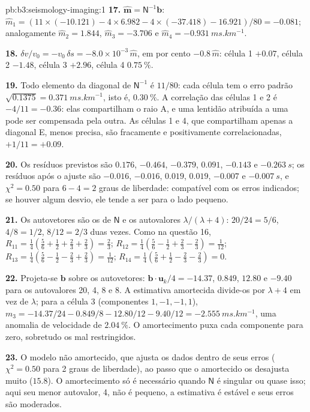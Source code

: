 \begin{solution}{pb:b3:seismology-imaging:1}
\textbf{17.} $\hat{\mathbf m} = \mathsf N^{-1}\mathbf b$:
$\hat m_1 = (11\times(-10.121) - 4\times6.982 - 4\times(-37.418) - 16.921)/80
= -0.081$; analogamente $\hat m_2 = 1.844$, $\hat m_3 = -3.706$ e
$\hat m_4 = \qty{-0.931}{ms.km^{-1}}$.

\textbf{18.} $\delta v/v_0 = -v_0\,\delta s = -8.0\times10^{-3}\,\hat m$, em
por cento $-0.8\,\hat m$: célula 1 $+0.07$, célula 2 $-1.48$, célula 3 $+2.96$, célula 4
$\qty{+0.75}{\percent}$.

\textbf{19.} Todo elemento da diagonal de $\mathsf N^{-1}$ é $11/80$: cada célula tem
o erro padrão $\sqrt{0.1375} = \qty{0.371}{ms.km^{-1}}$, isto é,
$\qty{0.30}{\percent}$. A correlação das células 1 e 2 é $-4/11 = -0.36$:
elas compartilham o raio A, e uma lentidão atribuída a uma pode ser compensada pela outra.
As células 1 e 4, que compartilham apenas a diagonal E, menos precisa, são fracamente e
positivamente correlacionadas, $+1/11 = +0.09$.

\textbf{20.} Os resíduos previstos são $0.176$, $-0.464$, $-0.379$, $0.091$,
$-0.143$ e $\qty{-0.263}{s}$; os resíduos após o ajuste são $-0.016$,
$-0.016$, $0.019$, $0.019$, $-0.007$ e $\qty{-0.007}{s}$, e
$\chi^2 = 0.50$ para $6 - 4 = 2$ graus de liberdade: compatível com os erros
indicados; se houver algum desvio, ele tende a ser para o lado pequeno.

\textbf{21.} Os autovetores são os de $\mathsf N$ e os autovalores
$\lambda/(\lambda + 4)$: $20/24 = 5/6$, $4/8 = 1/2$, $8/12 = 2/3$ duas vezes. Como na
questão 16, $R_{11} = \tfrac14(\tfrac56 + \tfrac12 + \tfrac23 + \tfrac23) =
\tfrac23$; $R_{12} = \tfrac14(\tfrac56 - \tfrac12 + \tfrac23 - \tfrac23) =
\tfrac1{12}$; $R_{13} = \tfrac14(\tfrac56 - \tfrac12 - \tfrac23 + \tfrac23) =
\tfrac1{12}$; $R_{14} = \tfrac14(\tfrac56 + \tfrac12 - \tfrac23 - \tfrac23) = 0$.

\textbf{22.} Projeta-se $\mathbf b$ sobre os autovetores: $\mathbf b\cdot\mathbf u_k/4
= -14.37$, $0.849$, $12.80$ e $-9.40$ para os autovalores 20, 4, 8 e 8.
A estimativa amortecida divide-os por $\lambda + 4$ em vez de $\lambda$; para
a célula 3 (componentes $1, -1, -1, 1$),
$m_3 = -14.37/24 - 0.849/8 - 12.80/12 - 9.40/12 = \qty{-2.555}{ms.km^{-1}}$,
uma anomalia de velocidade de $\qty{+2.04}{\percent}$. O amortecimento puxa cada componente
para zero, sobretudo os mal restringidos.

\textbf{23.} O modelo não amortecido, que ajusta os dados dentro de seus erros
($\chi^2 = 0.50$ para 2 graus de liberdade), ao passo que o amortecido os desajusta
muito ($15.8$). O amortecimento só é necessário quando $\mathsf N$ é singular ou quase
isso; aqui seu menor autovalor, 4, não é pequeno, a estimativa é estável e
seus erros são moderados.


\end{solution}
